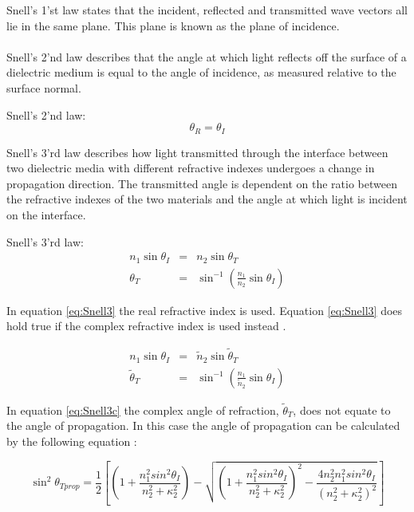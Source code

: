 Snell's 1'st law states that the incident, reflected and transmitted wave vectors all lie in the same plane. This plane is known as the plane of incidence.
\paragraph{}
Snell's 2'nd law describes that the angle at which light reflects off the surface of a dielectric medium is equal to the angle of incidence, as measured relative to the surface normal.

Snell's 2'nd law:
\begin{equation}
\theta_{R} = \theta_{I}
\label{eq:Snell2}
\end{equation}

Snell's 3'rd law describes how light transmitted through the interface between two dielectric media with different refractive indexes undergoes a change in propagation direction. The transmitted angle is dependent on the ratio between the refractive indexes of the two materials and the angle at which light is incident on the interface.

Snell's 3'rd law:
\begin{eqnarray}
n_{1}\sin{\theta_{I}} &=& n_{2}\sin{\theta_{T}}\\
\theta_{T} &=& \sin^{-1}{\left(\frac{n_{1}}{n_{2}}\sin{\theta_{I}}\right)}
\label{eq:Snell3}
\end{eqnarray}

In equation \ref{eq:Snell3} the real refractive index is used. Equation \ref{eq:Snell3} does hold true if the complex refractive index is used instead \cite{Kovalenko-2001}.

\begin{eqnarray}
n_{1}\sin{\theta_{I}} &=& \widetilde{n}_{2}\sin{\widetilde{\theta}_{T}}\\
\widetilde{\theta}_{T} &=& \sin^{-1}{\left(\frac{n_{1}}{\widetilde{n}_{2}}\sin{\theta_{I}}\right)}
\label{eq:Snell3c}
\end{eqnarray}

In equation \ref{eq:Snell3c} the complex angle of refraction, $\widetilde{\theta}_{T}$, does not equate to the angle of propagation.
In this case the angle of propagation can be calculated by the following equation \cite{Kovalenko-2001}:

\begin{equation}
\sin^{2}\theta_{T prop} = \frac{1}{2}\left[\left(1+\frac{n^{2}_{1}sin^{2}\theta_{I}}{n^{2}_{2} + \kappa^{2}_{2}}\right)-\sqrt{\left(1+\frac{n^{2}_{1}sin^{2}\theta_{I}}{n^{2}_{2} + \kappa^{2}_{2}}\right)^{2} - \frac{4n^{2}_{2}n^{2}_{1}sin^{2}\theta_{I}}{(n^{2}_{2} + \kappa^{2}_{2})^{2}}}\right]
\label{eq:prop}
\end{equation}

